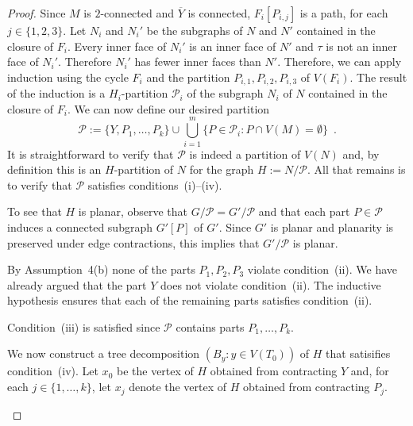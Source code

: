 \documentclass{patmorin}
\DeclareMathOperator{\tw}{tw}
\renewcommand{\le}{\leqslant}
\begin{document}
\begin{proof}
  Since $M$ is $2$-connected and $\overline{Y}$ is connected, $F_i[P_{i,j}]$ is a path, for each $j\in\{1,2,3\}$.  Let $N_i$ and $N_i'$ be the subgraphs of $N$ and $N'$ contained in the closure of $F_i$.  Every inner face of $N_i'$ is an inner face of $N'$ and $\tau$ is not an inner face of $N_i'$.  Therefore $N_i'$ has fewer inner faces than $N'$.  Therefore, we can apply induction using the cycle $F_i$ and the partition $P_{i,1},P_{i,2},P_{i,3}$ of $V(F_i)$.  The result of the induction is a $H_i$-partition $\mathcal{P}_i$ of the subgraph $N_i$ of $N$ contained in the closure of $F_i$.
  We can now define our desired partition
  \[
      \mathcal{P}:=\{Y, P_1,\ldots,P_k\} \cup \bigcup_{i=1}^m \{P\in\mathcal{P}_i: P\cap V(M)=\emptyset\} \enspace .
  \]
  It is straightforward to verify that $\mathcal{P}$ is indeed a partition of $V(N)$ and, by definition this is an $H$-partition of $N$ for the graph $H:=N/\mathcal{P}$.  All that remains is to verify that $\mathcal{P}$ satisfies conditions~(i)--(iv).
  \begin{compactenum}[(i)]
    \item To see that $H$ is planar, observe that $G/\mathcal{P}=G'/\mathcal{P}$ and that each part $P\in\mathcal{P}$ induces a connected subgraph $G'[P]$ of $G'$.  Since $G'$ is planar and planarity is preserved under edge contractions, this implies that $G'/\mathcal{P}$ is planar.

    \item  By Assumption~4(b) none of the parts $P_1,P_2,P_3$ violate condition~(ii).  We have already argued that the part $Y$ does not violate condition~(ii).  The inductive hypothesis ensures that each of the remaining parts satisfies condition~(ii).

    \item Condition~(iii) is satisfied since $\mathcal{P}$ contains parts $P_1,\ldots,P_k$.

    \item We now construct a tree decomposition $(B_y:y\in V(T_0))$ of $H$ that satisifies condition~(iv).
    Let $x_0$ be the vertex of $H$ obtained from contracting $Y$ and, for each $j\in\{1,\ldots,k\}$, let $x_j$ denote the vertex of $H$ obtained from contracting $P_j$.


\end{compactenum}
\end{proof}
\end{document}

